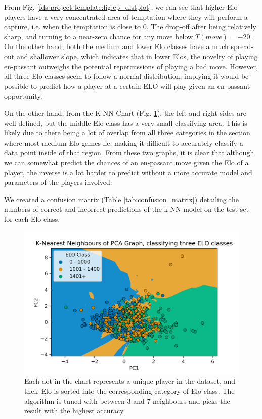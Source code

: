 \documentclass[10pt,a4paper]{article}
\begin{document}
\begin{multicols}{2}
From Fig. \ref{fds-project-template:fig:ep_distplot}, we can see that higher Elo players have a very concentrated area of temptation where they will perform a capture, i.e. when the temptation is close to $0$. The drop-off after being relatively sharp, and turning to a near-zero chance for any move below $T(move)=-20$. On the other hand, both the medium and lower Elo classes have a much spread-out and shallower slope, which indicates that in lower Elos, the novelty of playing en-passant outweighs the potential repercussions of playing a bad move. However, all three Elo classes seem to follow a normal distribution, implying it would be possible to predict how a player at a certain ELO will play given an en-passant opportunity.\newline

On the other hand, from the K-NN Chart (Fig. \ref{fds-project-template:fig:knn}), the left and right sides are well defined, but the middle Elo class has a very small classifying area. This is likely due to there being a lot of overlap from all three categories in the section where most medium Elo games lie, making it difficult to accurately classify a data point inside of that region. From these two graphs, it is clear that although we can somewhat predict the chances of an en-passant move given the Elo of a player, the inverse is a lot harder to predict without a more accurate model and parameters of the players involved. \newline

We created a confusion matrix (Table \ref{tab:confusion_matrix}) detailing the numbers of correct and incorrect predictions of the k-NN model on the test set for each Elo class. 

\begin{figure}[t]
  \centering
  \includegraphics[width=\textwidth]{report/images/knn_graph.png}
  \caption{Each dot in the chart represents a unique player in the dataset, and their Elo is sorted into the corresponding category of Elo class. The algorithm is tuned with between 3 and 7 neighbours and picks the result with the highest accuracy.}
  \label{fds-project-template:fig:knn}
\end{figure}


\end{multicols}
\end{document}
